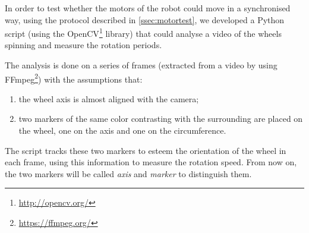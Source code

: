 In order to test whether the motors of the robot could move in a synchronised
way, using the protocol described in \autoref{ssec:motortest}, we developed a
Python script (using the OpenCV\footnote{\url{http://opencv.org/}} library) that could analyse a video of the
wheels spinning and measure the rotation periods.

\beforelist* The analysis is done on a series of frames (extracted from a video
by using FFmpeg\footnote{\url{https://ffmpeg.org/}}) with the assumptions that:
\begin{enumerate}
  \item the wheel axis is almost aligned with the camera;
  \item two markers of the same color contrasting with the surrounding are
    placed on the wheel, one on the axis and one on the circumference.
\end{enumerate}
\afterlist*
The script tracks these two markers to esteem the orientation of the wheel in
each frame, using this information to measure the rotation speed.
From now on, the two markers will be called \emph{axis} and \emph{marker} to
distinguish them.

